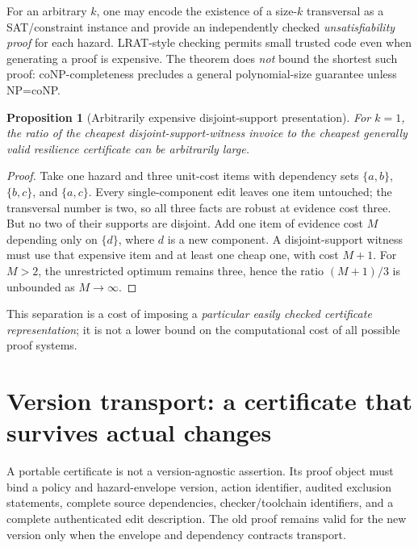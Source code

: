 \documentclass[11pt]{article}
\newtheorem{proposition}[theorem]{Proposition}
\begin{document}
For an arbitrary $k$, one may encode the existence of a size-$k$ transversal as a SAT/constraint instance and provide an independently checked \emph{unsatisfiability proof} for each hazard. LRAT-style checking permits small trusted code even when generating a proof is expensive. The theorem does \emph{not} bound the shortest such proof: coNP-completeness precludes a general polynomial-size guarantee unless NP=coNP.

\begin{proposition}[Arbitrarily expensive disjoint-support presentation]\label{prop:gap}
For $k=1$, the ratio of the cheapest disjoint-support-witness invoice to the cheapest generally valid resilience certificate can be arbitrarily large.
\end{proposition}
\begin{proof}
Take one hazard and three unit-cost items with dependency sets $\{a,b\}$, $\{b,c\}$, and $\{a,c\}$. Every single-component edit leaves one item untouched; the transversal number is two, so all three facts are robust at evidence cost three. But no two of their supports are disjoint. Add one item of evidence cost $M$ depending only on $\{d\}$, where $d$ is a new component. A disjoint-support witness must use that expensive item and at least one cheap one, with cost $M+1$. For $M>2$, the unrestricted optimum remains three, hence the ratio $(M+1)/3$ is unbounded as $M\to\infty$.\end{proof}

This separation is a cost of imposing a \emph{particular easily checked certificate representation}; it is not a lower bound on the computational cost of all possible proof systems.

\section{Version transport: a certificate that survives actual changes}
A portable certificate is not a version-agnostic assertion. Its proof object must bind a policy and hazard-envelope version, action identifier, audited exclusion statements, complete source dependencies, checker/toolchain identifiers, and a complete authenticated edit description. The old proof remains valid for the new version only when the envelope and dependency contracts transport.
\end{document}
